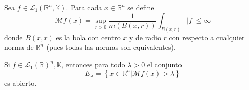 \documentclass[12pt]{report}
\theoremstyle{largebreak}
\renewcommand{\leq}{\ensuremath{\leqslant}}
\newcommand\abs[1]{\ensuremath{\left|#1\right|}}
\begin{document}
    \begin{mydef}
        Sea $f\in\mathcal{L}_1(\mathbb{R}^n,\mathbb{K})$. Para cada $x\in\mathbb{R}^n$ se define
        \begin{equation*}
            \mathcal{M}f(x)=\sup_{r>0}\frac{1}{m(B(x,r))}\int_{B(x,r)}\abs{f}\leq\infty
        \end{equation*}
        donde $B(x,r)$ es la bola con centro $x$ y de radio $r$ con respecto a cualquier norma de $\mathbb{R}^n$ (pues todas las normas son equivalentes).
    \end{mydef}

    \begin{propo}
        Si $f\in\mathcal{L}_1(\mathbb{R})^n,\mathbb{K}$, entonces para todo $\lambda>0$ el conjunto
        \begin{equation*}
            E_\lambda=\left\{x\in\mathbb{R}^n\Big|\mathcal{M}f(x)>\lambda \right\}
        \end{equation*}
        es abierto. 
    \end{propo}
\end{document}

